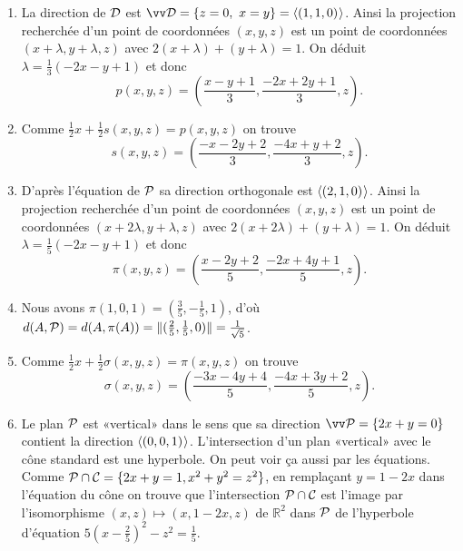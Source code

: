 \documentclass[a4paper,12pt,reqno]{amsart}
\begin{document}
\begin{solution}
  \begin{enumerate}
    \item La direction de $\mathcal{D}$ est $\ev{D}=\{z=0,\ x=y\}=\affspan{(1,1,0)}$. Ainsi la projection recherchée d'un point de coordonnées $(x,y,z)$ est un point de coordonnées $(x+\lambda,y+\lambda,z)$ avec $2(x+\lambda)+(y+\lambda)=1$. On déduit $\lambda=\frac{1}{3}(-2x-y+1)$ et donc
    \[
      p(x,y,z)=(\frac{x-y+1}{3},\frac{-2x+2y+1}{3},z).
    \]
    \item Comme $\frac{1}{2}x+\frac{1}{2}s(x,y,z)=p(x,y,z)$ on trouve
    \[
      s(x,y,z)=(\frac{-x-2y+2}{3},\frac{-4x+y+2}{3},z).
    \]
    \item D'après l'équation de $\mathcal{P}$ sa direction orthogonale est $\langle{(2,1,0)}\kern.07em\rangle$. Ainsi la projection recherchée d'un point de coordonnées $(x,y,z)$ est un point de coordonnées $(x+2\lambda,y+\lambda,z)$ avec $2(x+2\lambda)+(y+\lambda)=1$. On déduit $\lambda=\frac{1}{5}(-2x-y+1)$ et donc
    \[
      \pi(x,y,z)=(\frac{x-2y+2}{5},\frac{-2x+4y+1}{5},z).
    \]
    \item Nous avons $\pi(1,0,1)=(\frac{3}{5},-\frac{1}{5},1)$, d'où $d(A,\mathcal{P})=d(A,\pi(A))=\|(\frac{2}{5},\frac{1}{5},0)\|=\frac{1}{\sqrt{5}}$.
    \item Comme $\frac{1}{2}x+\frac{1}{2}\sigma(x,y,z)=\pi(x,y,z)$ on trouve
    \[
      \sigma(x,y,z)=(\frac{-3x-4y+4}{5},\frac{-4x+3y+2}{5},z).
    \]
    \item Le plan $\mathcal{P}$ est «vertical» dans le sens que sa direction $\ev{P}=\{2x+y=0\}$ contient la direction $\langle{(0,0,1)}\kern.07em\rangle$. L'intersection d'un plan «vertical» avec le cône standard est une hyperbole.\newline
    On peut voir ça aussi par les équations. Comme $\mathcal{P} \cap \mathcal{C}=\{2x+y=1, x^{2}+y^{2}=z^{2}\}$, en remplaçant $y=1-2x$ dans l'équation du cône on trouve que l'intersection $\mathcal{P} \cap \mathcal{C}$ est l'image par l'isomorphisme $(x,z)\mapsto(x,1-2x,z)$ de $\mathbb{R}^{2}$ dans $\mathcal{P}$ de l'hyperbole d'équation $5(x-\frac{2}{5})^{2}-z^{2}=\frac{1}{5}$.
  \end{enumerate}
\end{solution}
\end{document}
